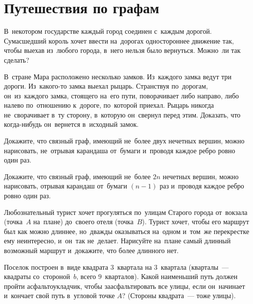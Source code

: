 
\section*{Путешествия по графам}


\begin{problems}

\item
В~некотором государстве каждый город соединен с~каждым дорогой.
Сумасшедший король хочет ввести на~дорогах одностороннее движение так, чтобы
выехав из~любого города, в~него нельзя было вернуться.
Можно~ли так сделать?

\item
В~стране Мара расположено несколько замков.
Из~каждого замка ведут три дороги.
Из~какого-то замка выехал рыцарь.
Странствуя по~дорогам, он~из~каждого замка, стоящего на~его пути, поворачивает
либо направо, либо налево по~отношению к~дороге, по~которой приехал.
Рыцарь никогда не~сворачивает в~ту сторону, в~которую он~свернул перед этим.
Доказать, что когда-нибудь он~вернется в~исходный замок.

\item
Докажите, что связный граф, имеющий не~более двух нечетных вершин, можно
нарисовать, не~отрывая карандаша от~бумаги и~проводя каждое ребро ровно один
раз.

\item
Докажите, что связный граф, имеющий не~более $2 n$ нечетных вершин, можно
нарисовать, отрывая карандаш от~бумаги $(n - 1)$ раз и~проводя каждое ребро
ровно один раз.

\item
Любознательный турист хочет прогуляться по~улицам Старого города от~вокзала
(точка~$A$ на~плане) до~своего отеля (точка~$B$).
Турист хочет, чтобы его маршрут был как можно длиннее, но~дважды оказываться
на~одном и~том~же перекрестке ему неинтересно, и~он~так не~делает.
Нарисуйте на~плане самый длинный возможный маршрут и~докажите, что более
длинного нет.

\begin{center}
\end{center}

\item
Поселок построен в~виде квадрата $3$~квартала на $3$~квартала (кварталы~---
квадраты со~стороной~$b$, всего $9$~кварталов).
Какой наименьший путь должен пройти асфальтоукладчик, чтобы заасфальтировать
все улицы, если он~начинает и~кончает свой путь в~угловой точке $A$?
(Стороны квадрата~--- тоже улицы).


\end{problems}
